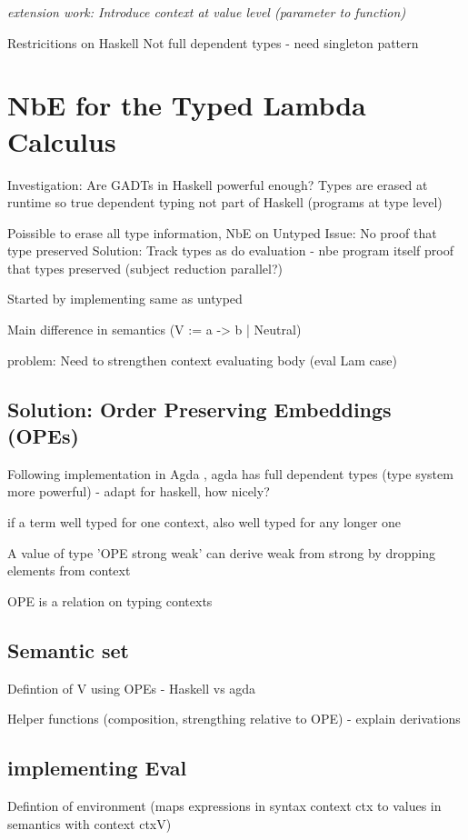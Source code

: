 \documentclass{article}
\begin{document}
\textit{extension work: Introduce context at value level (parameter to function)} 

Restricitions on Haskell
Not full dependent types - need singleton pattern

\section{NbE for the Typed Lambda Calculus}
Investigation: Are GADTs in Haskell powerful enough? Types are erased at runtime so true dependent typing not part of Haskell (programs at type level)

Poissible to erase all type information, NbE on Untyped
Issue: No proof that type preserved 
Solution: Track types as do evaluation - nbe program itself proof that types preserved (subject reduction parallel?)

Started by implementing same as untyped

Main difference in semantics (V := a -> b | Neutral) 
\cite{slides}

problem: Need to strengthen context evaluating body (eval Lam case)
\subsection{Solution: Order Preserving Embeddings (OPEs)}

Following implementation in Agda \cite{AgdaNbe}, agda has full dependent types (type system more powerful) - adapt for haskell, how nicely? 

if a term well typed for one context, also well typed for any longer one

A value of type 'OPE strong weak' can derive weak from strong by dropping elements from context

OPE is a relation on typing contexts

\subsection{Semantic set}

Defintion of V using OPEs - Haskell vs agda

Helper functions (composition, strengthing relative to OPE) - explain derivations

\subsection{implementing Eval}

Defintion of environment (maps expressions in syntax context ctx to values in semantics with context ctxV)
\end{document}
